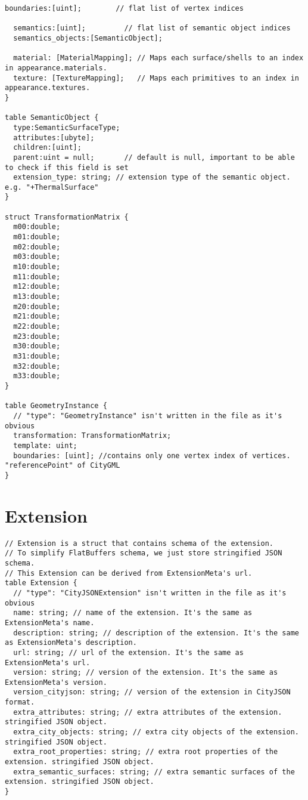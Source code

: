 \begin{lstlisting}[caption={Geometry schema}, basicstyle=\small]
  boundaries:[uint];        // flat list of vertex indices

  semantics:[uint];         // flat list of semantic object indices
  semantics_objects:[SemanticObject];

  material: [MaterialMapping]; // Maps each surface/shells to an index in appearance.materials.
  texture: [TextureMapping];   // Maps each primitives to an index in appearance.textures.
}

table SemanticObject {
  type:SemanticSurfaceType;
  attributes:[ubyte];
  children:[uint];
  parent:uint = null;       // default is null, important to be able to check if this field is set
  extension_type: string; // extension type of the semantic object. e.g. "+ThermalSurface"
}

struct TransformationMatrix {
  m00:double;
  m01:double;
  m02:double;
  m03:double;
  m10:double;
  m11:double;
  m12:double;
  m13:double;
  m20:double;
  m21:double;
  m22:double;
  m23:double;
  m30:double;
  m31:double;
  m32:double;
  m33:double;
}

table GeometryInstance {
  // "type": "GeometryInstance" isn't written in the file as it's obvious
  transformation: TransformationMatrix;
  template: uint;
  boundaries: [uint]; //contains only one vertex index of vertices. "referencePoint" of CityGML
}
\end{lstlisting}

\section{Extension}
\label{appendix:flatcitybuf_schema:extension}
\begin{lstlisting}[caption={Extension schema}, basicstyle=\small]
// Extension is a struct that contains schema of the extension.
// To simplify FlatBuffers schema, we just store stringified JSON schema.
// This Extension can be derived from ExtensionMeta's url.
table Extension {
  // "type": "CityJSONExtension" isn't written in the file as it's obvious
  name: string; // name of the extension. It's the same as ExtensionMeta's name.
  description: string; // description of the extension. It's the same as ExtensionMeta's description.
  url: string; // url of the extension. It's the same as ExtensionMeta's url.
  version: string; // version of the extension. It's the same as ExtensionMeta's version.
  version_cityjson: string; // version of the extension in CityJSON format.
  extra_attributes: string; // extra attributes of the extension. stringified JSON object.
  extra_city_objects: string; // extra city objects of the extension. stringified JSON object.
  extra_root_properties: string; // extra root properties of the extension. stringified JSON object.
  extra_semantic_surfaces: string; // extra semantic surfaces of the extension. stringified JSON object.
}
\end{lstlisting}

